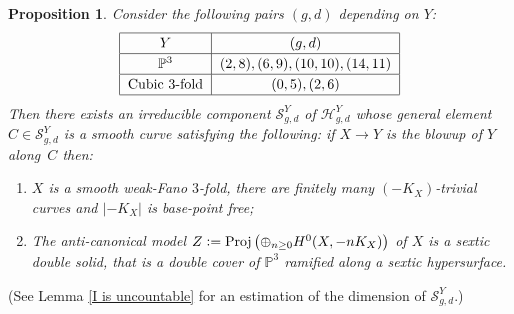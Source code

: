\documentclass[JEP,XML,SOM,Unicode,published]{cedram}
\theoremstyle{plain}
\newtheorem{proposition}[theorem]{Proposition}
\theoremstyle{definition}
\newcommand\Proj{\operatorname{Proj}}
\newcommand{\PP}{\mathbb{P}}
\newcommand{\defeq}{\vcentcolon=}
\begin{document}
\begin{proposition}\label{generalities on the involutions}
Consider the following pairs $(g,d)$ depending on $Y$:
\[\arraycolsep=6pt\def\arraystretch{1.2}
\begin{array}{|c|c|}
\hline
Y & (g,d)\\
\hline
\PP^3 & (2,8), (6,9), (10,10), (14,11)\\
\hline
\text{Cubic $3$-fold} & (0,5), (2,6)\\
\hline
\end{array}
\]
Then there exists an irreducible component $\mathcal{S}_{g,d}^Y$ of $\mathcal{H}_{g,d}^Y$ whose general element $C \in \mathcal{S}_{g,d}^Y$ is a smooth curve satisfying the following:
if $X \to Y$ is the blowup of $Y$ along~$C$ then:
\begin{enumerate}
\item\label{prop:i} $X$ is a smooth weak-Fano $3$-fold, there are finitely many $(-K_X)$-trivial curves and $\lvert -K_X \rvert$ is base-point free;
\item\label{prop:ii} The anti-canonical model $Z \defeq \Proj\left(\oplus_{n\geq 0}H^0(X,-nK_X)\right)$ of $X$ is a sextic double solid, that is a double cover of $\PP^3$ ramified along a sextic hypersurface.
\end{enumerate}
\end{proposition}

(See Lemma \ref{I is uncountable} for an estimation of the dimension of $\mathcal{S}_{g,d}^Y$.)
\end{document}
